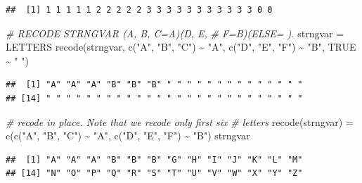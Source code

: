 \documentclass[
]{book}
\newenvironment{Shaded}{\begin{snugshade}}{\end{snugshade}}
\newcommand{\CommentTok}[1]{\textcolor[rgb]{0.56,0.35,0.01}{\textit{#1}}}
\newcommand{\ConstantTok}[1]{\textcolor[rgb]{0.00,0.00,0.00}{#1}}
\newcommand{\FunctionTok}[1]{\textcolor[rgb]{0.00,0.00,0.00}{#1}}
\newcommand{\NormalTok}[1]{#1}
\newcommand{\OtherTok}[1]{\textcolor[rgb]{0.56,0.35,0.01}{#1}}
\newcommand{\SpecialCharTok}[1]{\textcolor[rgb]{0.00,0.00,0.00}{#1}}
\newcommand{\StringTok}[1]{\textcolor[rgb]{0.31,0.60,0.02}{#1}}
\begin{document}
\begin{verbatim}
##  [1] 1 1 1 1 1 2 2 2 2 2 3 3 3 3 3 3 3 3 3 3 3 0 0
\end{verbatim}

\begin{Shaded}
\begin{Highlighting}[]
\CommentTok{\# RECODE STRNGVAR (\textquotesingle{}A\textquotesingle{}, \textquotesingle{}B\textquotesingle{}, \textquotesingle{}C\textquotesingle{}=\textquotesingle{}A\textquotesingle{})(\textquotesingle{}D\textquotesingle{}, \textquotesingle{}E\textquotesingle{},}
\CommentTok{\# \textquotesingle{}F\textquotesingle{}=\textquotesingle{}B\textquotesingle{})(ELSE=\textquotesingle{} \textquotesingle{}).}
\NormalTok{strngvar }\OtherTok{=}\NormalTok{ LETTERS}
\FunctionTok{recode}\NormalTok{(strngvar, }\FunctionTok{c}\NormalTok{(}\StringTok{"A"}\NormalTok{, }\StringTok{"B"}\NormalTok{, }\StringTok{"C"}\NormalTok{) }\SpecialCharTok{\textasciitilde{}} \StringTok{"A"}\NormalTok{, }\FunctionTok{c}\NormalTok{(}\StringTok{"D"}\NormalTok{, }\StringTok{"E"}\NormalTok{, }\StringTok{"F"}\NormalTok{) }\SpecialCharTok{\textasciitilde{}} 
  \StringTok{"B"}\NormalTok{, }\ConstantTok{TRUE} \SpecialCharTok{\textasciitilde{}} \StringTok{" "}\NormalTok{)}
\end{Highlighting}
\end{Shaded}

\begin{verbatim}
##  [1] "A" "A" "A" "B" "B" "B" " " " " " " " " " " " " " "
## [14] " " " " " " " " " " " " " " " " " " " " " " " " " "
\end{verbatim}

\begin{Shaded}
\begin{Highlighting}[]
\CommentTok{\# recode in place. Note that we recode only first six}
\CommentTok{\# letters}
\FunctionTok{recode}\NormalTok{(strngvar) }\OtherTok{=} \FunctionTok{c}\NormalTok{(}\FunctionTok{c}\NormalTok{(}\StringTok{"A"}\NormalTok{, }\StringTok{"B"}\NormalTok{, }\StringTok{"C"}\NormalTok{) }\SpecialCharTok{\textasciitilde{}} \StringTok{"A"}\NormalTok{, }\FunctionTok{c}\NormalTok{(}\StringTok{"D"}\NormalTok{, }\StringTok{"E"}\NormalTok{, }
  \StringTok{"F"}\NormalTok{) }\SpecialCharTok{\textasciitilde{}} \StringTok{"B"}\NormalTok{)}
\NormalTok{strngvar}
\end{Highlighting}
\end{Shaded}

\begin{verbatim}
##  [1] "A" "A" "A" "B" "B" "B" "G" "H" "I" "J" "K" "L" "M"
## [14] "N" "O" "P" "Q" "R" "S" "T" "U" "V" "W" "X" "Y" "Z"
\end{verbatim}
\end{document}
